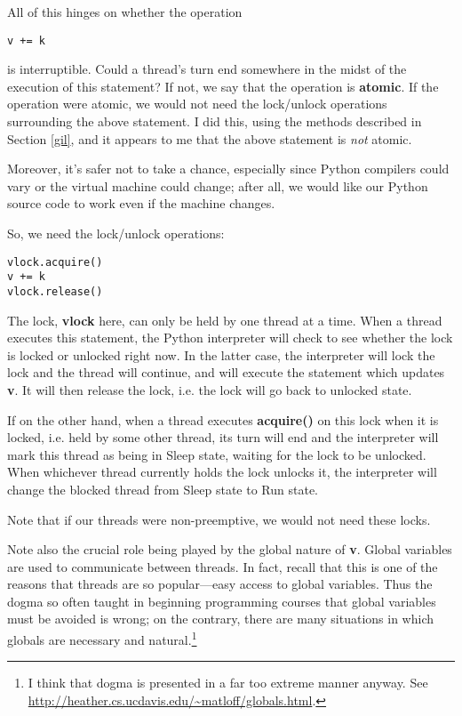 All of this hinges on whether the operation

\begin{Verbatim}[fontsize=\relsize{-2}]
v += k
\end{Verbatim}

is interruptible.  Could a thread's turn end somewhere in the midst of
the execution of this statement?  If not, we say that the operation is
{\bf atomic}.  If the operation were atomic, we would not need the
lock/unlock operations surrounding the above statement.  I did this,
using the methods described in Section \ref{gil}, and it appears to me
that the above statement is {\it not} atomic.

Moreover, it's safer not to take a chance, especially since Python
compilers could vary or the virtual machine could change; after all, we
would like our Python source code to work even if the machine changes.

So, we need the lock/unlock operations:

\begin{Verbatim}[fontsize=\relsize{-2}]
vlock.acquire()
v += k
vlock.release()
\end{Verbatim}

The lock, {\bf vlock} here, can only be held by one thread at a time.
When a thread executes this statement, the Python interpreter will check
to see whether the lock is locked or unlocked right now.  In the latter
case, the interpreter will lock the lock and the thread will continue,
and will execute the statement which updates {\bf v}.  It will then
release the lock, i.e. the lock will go back to unlocked state.

If on the other hand, when a thread executes {\bf acquire()} on this
lock when it is locked, i.e. held by some other thread, its turn will
end and the interpreter will mark this thread as being in Sleep state,
waiting for the lock to be unlocked.  When whichever thread currently
holds the lock unlocks it, the interpreter will change the blocked
thread from Sleep state to Run state.

Note that if our threads were non-preemptive, we would not need
these locks.

Note also the crucial role being played by the global nature of {\bf v}.
Global variables are used to communicate between threads.  In fact,
recall that this is one of the reasons that threads are so
popular---easy access to global variables.  Thus the dogma so often
taught in beginning programming courses that global variables must be
avoided is wrong; on the contrary, there are many situations in which
globals are necessary and natural.\footnote{I think that dogma is
presented in a far too extreme manner anyway.  See
\url{http://heather.cs.ucdavis.edu/~matloff/globals.html}. }

